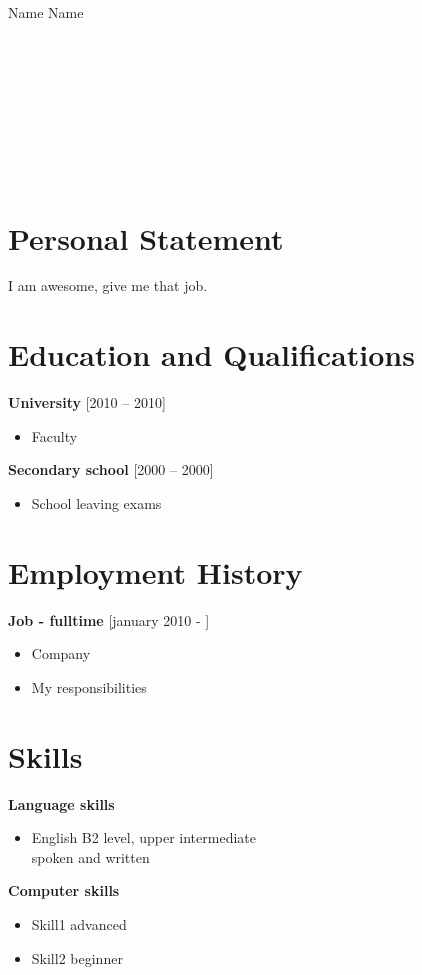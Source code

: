\documentclass[11pt]{article}
\begin{document}
\begin{center}
        {\fontsize{35}{45}\selectfont Name Name} \\
        \ \\
         \\
         \\
         \\
         \\
         \\
         \\
        \ \\
\end{center}

\section*{Personal Statement}
\noindent{\rule{\linewidth}{0.4pt}}
I am awesome, give me that job.

\section*{Education and Qualifications}
\noindent{\rule{\linewidth}{0.4pt}}
\textbf{University} [2010 – 2010]
\begin{itemize}
        \item Faculty
\end{itemize}
\textbf{Secondary school} [2000 – 2000]
\begin{itemize}
        \item School leaving exams
\end{itemize}

\section*{Employment History}
\noindent{\rule{\linewidth}{0.4pt}}
\textbf{Job - fulltime} [january 2010 - ]
\begin{itemize}
        \item Company
        \item My responsibilities
\end{itemize}

\section*{Skills}
\noindent{\rule{\linewidth}{0.4pt}}
\textbf{Language skills}
\begin{itemize}
        \item English \tab B2 level, upper intermediate \\ \phantom{invisible} \tab spoken and written
\end{itemize}
\textbf{Computer skills}
\begin{itemize}
        \item Skill1 \tab advanced
        \item Skill2 \tab beginner
\end{itemize}
\end{document}
